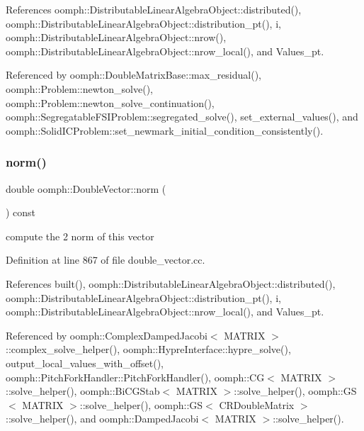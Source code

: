 References oomph\+::\+Distributable\+Linear\+Algebra\+Object\+::distributed(), oomph\+::\+Distributable\+Linear\+Algebra\+Object\+::distribution\+\_\+pt(), i, oomph\+::\+Distributable\+Linear\+Algebra\+Object\+::nrow(), oomph\+::\+Distributable\+Linear\+Algebra\+Object\+::nrow\+\_\+local(), and Values\+\_\+pt.



Referenced by oomph\+::\+Double\+Matrix\+Base\+::max\+\_\+residual(), oomph\+::\+Problem\+::newton\+\_\+solve(), oomph\+::\+Problem\+::newton\+\_\+solve\+\_\+continuation(), oomph\+::\+Segregatable\+F\+S\+I\+Problem\+::segregated\+\_\+solve(), set\+\_\+external\+\_\+values(), and oomph\+::\+Solid\+I\+C\+Problem\+::set\+\_\+newmark\+\_\+initial\+\_\+condition\+\_\+consistently().

\mbox{\label{classoomph_1_1DoubleVector_a9ac9245cac87ddcdb70cfcd697553a55}} 
\subsubsection{\texorpdfstring{norm()}{norm()}\hspace{0.1cm}{\footnotesize\ttfamily [1/2]}}
{\footnotesize\ttfamily double oomph\+::\+Double\+Vector\+::norm (\begin{DoxyParamCaption}{ }\end{DoxyParamCaption}) const}



compute the 2 norm of this vector 



Definition at line 867 of file double\+\_\+vector.\+cc.



References built(), oomph\+::\+Distributable\+Linear\+Algebra\+Object\+::distributed(), oomph\+::\+Distributable\+Linear\+Algebra\+Object\+::distribution\+\_\+pt(), i, oomph\+::\+Distributable\+Linear\+Algebra\+Object\+::nrow\+\_\+local(), and Values\+\_\+pt.



Referenced by oomph\+::\+Complex\+Damped\+Jacobi$<$ M\+A\+T\+R\+I\+X $>$\+::complex\+\_\+solve\+\_\+helper(), oomph\+::\+Hypre\+Interface\+::hypre\+\_\+solve(), output\+\_\+local\+\_\+values\+\_\+with\+\_\+offset(), oomph\+::\+Pitch\+Fork\+Handler\+::\+Pitch\+Fork\+Handler(), oomph\+::\+C\+G$<$ M\+A\+T\+R\+I\+X $>$\+::solve\+\_\+helper(), oomph\+::\+Bi\+C\+G\+Stab$<$ M\+A\+T\+R\+I\+X $>$\+::solve\+\_\+helper(), oomph\+::\+G\+S$<$ M\+A\+T\+R\+I\+X $>$\+::solve\+\_\+helper(), oomph\+::\+G\+S$<$ C\+R\+Double\+Matrix $>$\+::solve\+\_\+helper(), and oomph\+::\+Damped\+Jacobi$<$ M\+A\+T\+R\+I\+X $>$\+::solve\+\_\+helper().

